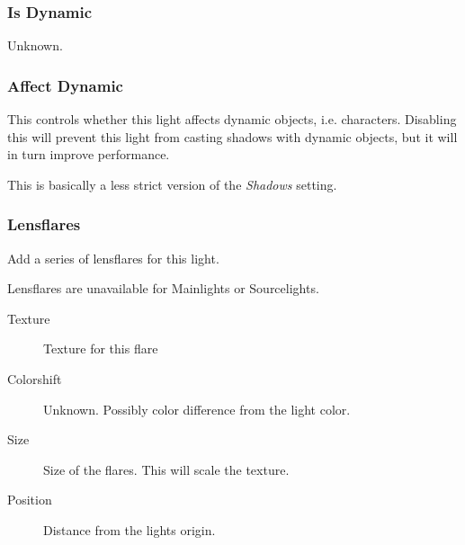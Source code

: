 \subsubsection*{Is Dynamic}
Unknown.

\subsubsection*{Affect Dynamic}
This controls whether this light affects dynamic objects, i.e. characters.
Disabling this will prevent this light from casting shadows with dynamic
objects, but it will in turn improve performance.

This is basically a less strict version of the \textit{Shadows} setting.

\subsubsection*{Lensflares}
Add a series of lensflares for this light.

Lensflares are unavailable for Mainlights or Sourcelights.
\begin{description}
    \item[Texture] Texture for this flare
    \item[Colorshift] Unknown. Possibly color difference from the light color.
    \item[Size] Size of the flares. This will scale the texture.
    \item[Position] Distance from the lights origin.
\end{description}
